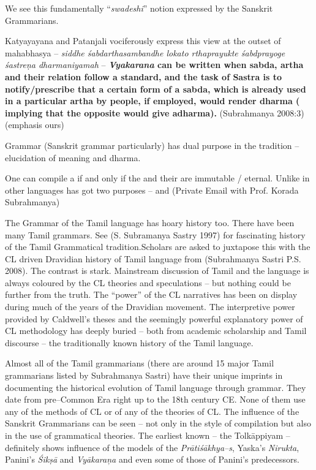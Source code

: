 We see this fundamentally “\textit{swadeshi}” notion expressed by the Sanskrit Grammarians.

\begin{myquote}
Katyayayana and Patanjali vociferously express this view at the outset of mahabhasya – \textit{siddhe śabdarthasambandhe lokato rthaprayukte śabdprayoge śastreṇa dharmaniyamah} – \textbf{\textit{Vyakarana} can be written when sabda, artha and their relation follow a standard, and the task of Sastra is to notify/prescribe that a certain form of a sabda, which is already used in a particular artha by people, if employed, would render dharma ( implying that the opposite would give adharma).} (Subrahmanya 2008:3) (emphasis ours)
\end{myquote}

Grammar (Sanskrit grammar particularly) has dual purpose in the tradition – elucidation of meaning and dharma.

\begin{myquote}
One can compile a  if and only if the  and their  are immutable / eternal. Unlike in other languages  has got two purposes –  and  (Private Email with Prof. Korada Subrahmanya)
\end{myquote}

The Grammar of the Tamil language has hoary history too. There have been many Tamil grammars. See (S. Subramanya Sastry 1997) for fascinating history of the Tamil Grammatical tradition.Scholars are asked to juxtapose this with the CL driven Dravidian history of Tamil language from (Subrahmanya Sastri P.S. 2008). The contrast is stark. Mainstream discussion of Tamil and the language is always coloured by the CL theories and speculations – but nothing could be further from the truth. The “power” of the CL narratives has been on display during much of the years of the Dravidian movement. The interpretive power provided by Caldwell’s theses and the seemingly powerful explanatory power of CL methodology has deeply buried – both from academic scholarship and Tamil discourse – the traditionally known history of the Tamil language.

\newpage

Almost all of the Tamil grammarians (there are around 15 major Tamil grammarians listed by Subrahmanya Sastri) have their unique imprints in documenting the historical evolution of Tamil language through grammar. They date from pre–Common Era right up to the 18th century CE. None of them use any of the methods of CL or of any of the theories of CL. The influence of the Sanskrit Grammarians can be seen – not only in the style of compilation but also in the use of grammatical theories. The earliest known – the Tolkāppiyam – definitely shows influence of the models of the \textit{Prātiśākhya–s}, Yaska’s \textit{Nirukta}, Panini’s \textit{Śikṣā} and \textit{Vyākaraņa} and even some of those of Panini’s predecessors.

